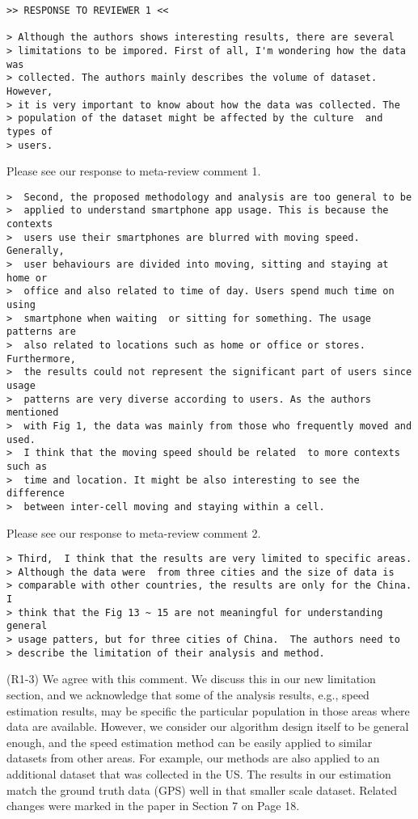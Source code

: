 \newpage
\begin{verbatim}
>> RESPONSE TO REVIEWER 1 <<

> Although the authors shows interesting results, there are several
> limitations to be impored. First of all, I'm wondering how the data was
> collected. The authors mainly describes the volume of dataset. However,
> it is very important to know about how the data was collected. The
> population of the dataset might be affected by the culture  and types of
> users.
\end{verbatim}

Please see our response to meta-review comment 1.

\begin{verbatim}
>  Second, the proposed methodology and analysis are too general to be
>  applied to understand smartphone app usage. This is because the contexts
>  users use their smartphones are blurred with moving speed. Generally,
>  user behaviours are divided into moving, sitting and staying at home or
>  office and also related to time of day. Users spend much time on using
>  smartphone when waiting  or sitting for something. The usage patterns are
>  also related to locations such as home or office or stores. Furthermore,
>  the results could not represent the significant part of users since usage
>  patterns are very diverse according to users. As the authors mentioned
>  with Fig 1, the data was mainly from those who frequently moved and used.
>  I think that the moving speed should be related  to more contexts such as
>  time and location. It might be also interesting to see the difference
>  between inter-cell moving and staying within a cell.
\end{verbatim}

Please see our response to meta-review comment 2.

\begin{verbatim}
> Third,  I think that the results are very limited to specific areas.
> Although the data were  from three cities and the size of data is
> comparable with other countries, the results are only for the China. I
> think that the Fig 13 ~ 15 are not meaningful for understanding general
> usage patters, but for three cities of China.  The authors need to
> describe the limitation of their analysis and method.
\end{verbatim}

(R1-3) We agree with this comment. We discuss this in our new limitation section, and we acknowledge that some of the analysis results, e.g., speed estimation results, may be specific the particular population in those areas where data are available. However, we consider our algorithm design itself to be general enough, and the speed estimation method can be easily applied to similar datasets from other areas.  For example, our methods are also applied to an additional dataset that was collected in the US. The results in our estimation match the ground truth data (GPS) well in that smaller scale dataset. Related changes were marked in the paper in Section 7 on Page 18.
 

